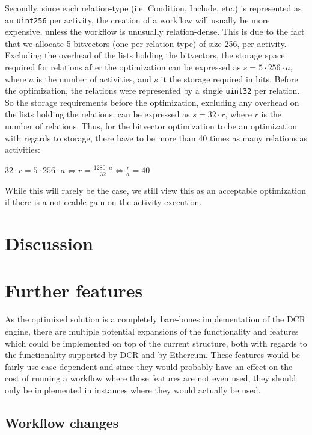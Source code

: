 \documentclass{article}
\begin{document}
		Secondly, since each relation-type (i.e. Condition, Include, etc.) is represented as an \texttt{uint256} per activity, the creation of a workflow will usually be more expensive, unless the workflow is unusually relation-dense. 
		This is due to the fact that we allocate 5 bitvectors (one per relation type) of size 256, per activity. 
		Excluding the overhead of the lists holding the bitvectors, the storage space required for relations after the optimization can be expressed as $s = 5 \cdot 256 \cdot a$, where $a$ is the number of activities, and $s$ it the storage required in bits.
		Before the optimization, the relations were represented by a single \texttt{uint32} per relation.
		So the storage requirements before the optimization, excluding any overhead on the lists holding the relations, can be expressed as $s = 32 \cdot r$, where $r$ is the number of relations.
		Thus, for the bitvector optimization to be an optimization with regards to storage, there have to be more than 40 times as many relations as activities:

		\begin{center}		
			$32 \cdot r = 5 \cdot 256 \cdot a \iff r = \frac{1280 \cdot a}{32} \iff \frac{r}{a} = 40$
		\end{center}
		
		While this will rarely be the case, we still view this as an acceptable optimization if there is a noticeable gain on the activity execution.
		


	\section{Discussion}

	\section{Further features}
		As the optimized solution is a completely bare-bones implementation of the DCR engine, there are multiple potential expansions of the functionality and features which could be implemented on top of the current structure, both with regards to the functionality supported by DCR and by Ethereum.
		These features would be fairly use-case dependent and since they would probably have an effect on the cost of running a workflow where those features are not even used, they should only be implemented in instances where they would actually be used.

		\subsection{Workflow changes}
		\label{sec:workflow-changes}
\end{document}
